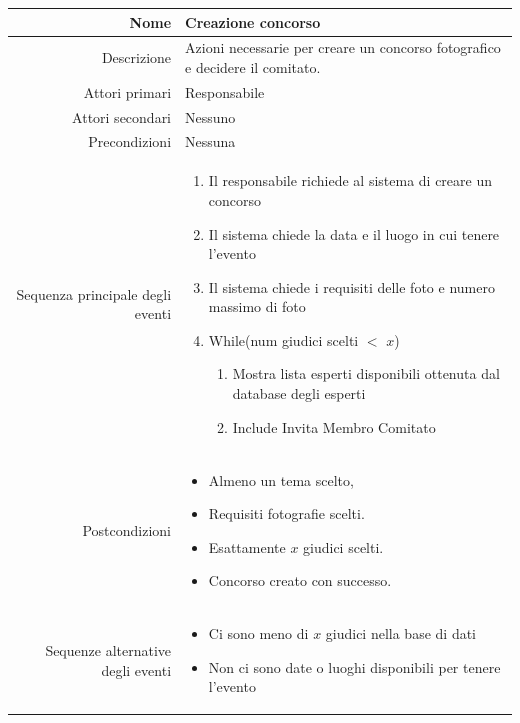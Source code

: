 \documentclass{article}
\begin{document}
\begin{center}
    \begin{tabular}{ |r|p{9cm}| }
        \hline
        Nome                              & Creazione concorso                                                           \\
        \hline
        Descrizione                       & Azioni necessarie per creare un concorso fotografico e decidere il comitato. \\
        \hline
        Attori primari                    & Responsabile                                                                 \\
        \hline
        Attori secondari                  & Nessuno                                                                      \\
        \hline
        Precondizioni                     & Nessuna                                                                      \\
        \hline
        Sequenza principale degli eventi  &
        \begin{enumerate}
            \item Il responsabile richiede al sistema di creare un concorso
            \item Il sistema chiede la data e il luogo in cui tenere l’evento
            \item Il sistema chiede i requisiti delle foto e numero massimo di foto
            \item While(num giudici scelti $<$ $x$)
                  \begin{enumerate}
                      \item Mostra lista esperti disponibili ottenuta dal database degli esperti
                      \item Include Invita Membro Comitato
                  \end{enumerate}
        \end{enumerate}
        \\
        \hline
        Postcondizioni                    &
        \begin{itemize}
            \item Almeno un tema scelto,
            \item Requisiti fotografie scelti.
            \item Esattamente $x$ giudici scelti.
            \item Concorso creato con successo.
        \end{itemize}
        \\
        \hline
        Sequenze alternative degli eventi &
        \begin{itemize}
            \item Ci sono meno di $x$ giudici nella base di dati
            \item Non ci sono date o luoghi disponibili per tenere l’evento
        \end{itemize}
        \\
        \hline
    \end{tabular}
\end{center}
\end{document}
